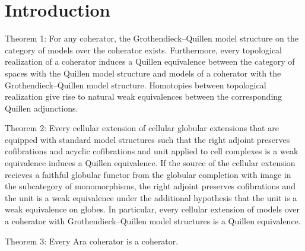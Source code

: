 \section{Introduction} \label{sec: introduction}

Theorem 1: For any coherator, the Grothendieck--Quillen model structure on the category of models over the coherator exists. Furthermore, every topological realization of a coherator induces a Quillen equivalence between the category of spaces with the Quillen model structure and models of a coherator with the Grothendieck--Quillen model structure. Homotopies between topological realization give rise to natural weak equivalences between the corresponding Quillen adjunctions.

Theorem 2: Every cellular extension of cellular globular extensions that are equipped with standard model structures such that the right adjoint preserves cofibrations and acyclic cofibrations and unit applied to cell complexes is a weak equivalence induces a Quillen equivalence. If the source of the cellular extension recieves a faithful globular functor from the globular completion with image in the subcategory of monomorphisms, the right adjoint preserves cofibrations and the unit is a weak equivalence under the additional hypothesis that the unit is a weak equivalence on globes. In particular, every cellular extension of models over a coherator with Grothendieck--Quillen model structures is a Quillen equivalence.

Theorem 3: Every Ara coherator is a coherator.